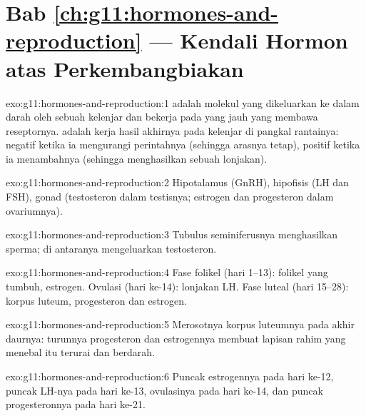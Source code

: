 \section*{Bab \ref{ch:g11:hormones-and-reproduction} --- Kendali Hormon atas Perkembangbiakan}

\begin{solution}{exo:g11:hormones-and-reproduction:1}
 adalah molekul yang dikeluarkan ke dalam darah oleh sebuah
kelenjar dan bekerja pada  yang jauh yang membawa reseptornya.  adalah kerja hasil akhirnya pada kelenjar di pangkal rantainya:
negatif ketika ia mengurangi perintahnya (sehingga arasnya tetap),
positif ketika ia menambahnya (sehingga menghasilkan sebuah lonjakan).
\end{solution}

\begin{solution}{exo:g11:hormones-and-reproduction:2}
Hipotalamus (GnRH), hipofisis (LH dan FSH), gonad (testosteron dalam
testisnya; estrogen dan progesteron dalam ovariumnya).
\end{solution}

\begin{solution}{exo:g11:hormones-and-reproduction:3}
Tubulus seminiferusnya menghasilkan sperma;  di antaranya
mengeluarkan testosteron.
\end{solution}

\begin{solution}{exo:g11:hormones-and-reproduction:4}
Fase folikel (hari 1--13): folikel yang tumbuh, estrogen. Ovulasi (hari
ke-14): lonjakan LH. Fase luteal (hari 15--28): korpus luteum,
progesteron dan estrogen.
\end{solution}

\begin{solution}{exo:g11:hormones-and-reproduction:5}
Merosotnya korpus luteumnya pada akhir daurnya: turunnya progesteron
dan estrogennya membuat lapisan rahim yang menebal itu terurai dan
berdarah.
\end{solution}

\begin{solution}{exo:g11:hormones-and-reproduction:6}
Puncak estrogennya pada hari ke-12, puncak LH-nya pada hari ke-13,
ovulasinya pada hari ke-14, dan puncak progesteronnya pada hari ke-21.
\end{solution}

